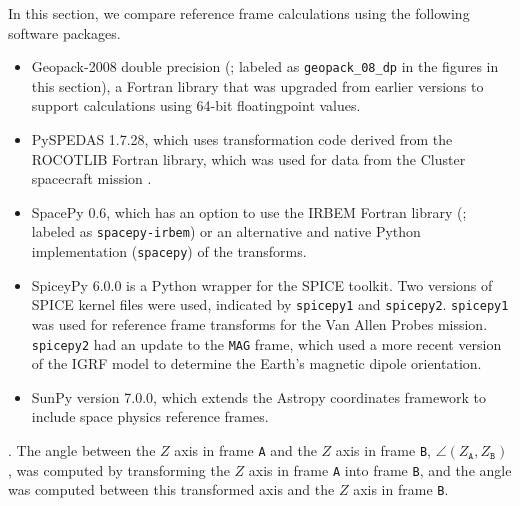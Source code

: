 \documentclass[draft]{agujournal2019}
\begin{document}
In this section, we compare reference frame calculations using the following software packages. 

\begin{itemize}
    \item Geopack-2008 double precision (; labeled as \texttt{geopack\_08\_dp} in the figures in this section), a Fortran library that was upgraded from earlier versions to support calculations using 64-bit floating\add[a]{-}point values.
    \item PySPEDAS 1.7.28, which uses transformation code derived from  \cite{Angelopoulos2024IDL} the ROCOTLIB Fortran \cite{ROCOTLIB} library, which was used for data from the Cluster spacecraft mission \cite{ClusterTools1993}.
    \item SpacePy 0.6, which has an option to use the IRBEM Fortran library (; labeled as \texttt{spacepy-irbem}) or an alternative and native Python implementation (\texttt{spacepy}) of the transforms.
    \item SpiceyPy 6.0.0 is a Python wrapper for the SPICE toolkit. Two versions of SPICE kernel files were used, indicated by \texttt{spicepy1} and \texttt{spicepy2}. \texttt{spicepy1} was used for reference frame transforms for the Van Allen Probes mission. \texttt{spicepy2} had an update to the \texttt{MAG} frame, which used a more recent version of the IGRF model \cite{Alken2021} to determine the Earth's magnetic dipole orientation. 
    \item SunPy version 7.0.0, which extends the Astropy coordinates framework to include space physics reference frames.
\end{itemize}

 . The angle between the $Z$ axis in frame \texttt{A} and the $Z$ axis in frame \texttt{B}, $\angle (Z_\mathtt{A}, Z_\mathtt{B})$, was computed by transforming the $Z$ axis in frame \texttt{A} into frame \texttt{B}, and the angle was computed between this transformed axis and the $Z$ axis in frame \texttt{B}. 
\end{document}
